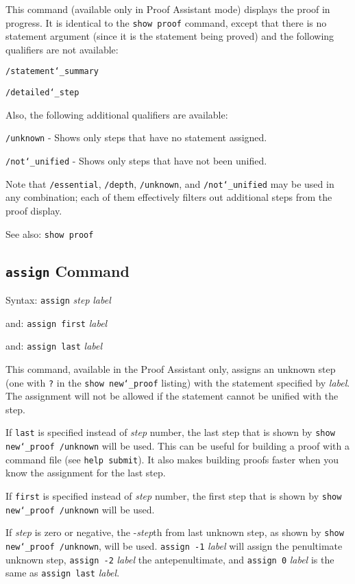 This command (available only in Proof Assistant mode) displays the proof
in progress.  It is identical to the \texttt{show proof} command, except that
there is no statement argument (since it is the statement being proved) and
the following qualifiers are not available:

    \texttt{/statement{\char`\_}summary}

    \texttt{/detailed{\char`\_}step}

Also, the following additional qualifiers are available:

    \texttt{/unknown} - Shows only steps that have no statement assigned.

    \texttt{/not{\char`\_}unified} - Shows only steps that have not been unified.

Note that \texttt{/essential}, \texttt{/depth}, \texttt{/unknown}, and
\texttt{/not{\char`\_}unified} may be
used in any combination; each of them effectively filters out additional
steps from the proof display.

See also:  \texttt{show proof}






\subsection{\texttt{assign} Command}
Syntax:   \texttt{assign} {\em step} {\em label}

   and:   \texttt{assign first} {\em label}

   and:   \texttt{assign last} {\em label}


This command, available in the Proof Assistant only, assigns an unknown
step (one with \texttt{?} in the \texttt{show new{\char`\_}proof}
listing) with the statement specified by {\em label}.  The assignment
will not be allowed if the statement cannot be unified with the step.

If \texttt{last} is specified instead of {\em step} number, the last
step that is shown by \texttt{show new{\char`\_}proof /unknown} will be
used.  This can be useful for building a proof with a command file (see
\texttt{help submit}).  It also makes building proofs faster when you know
the assignment for the last step.

If \texttt{first} is specified instead of {\em step} number, the first
step that is shown by \texttt{show new{\char`\_}proof /unknown} will be
used.

If {\em step} is zero or negative, the -{\em step}th from last unknown
step, as shown by \texttt{show new{\char`\_}proof /unknown}, will be
used.  \texttt{assign -1} {\em label} will assign the penultimate
unknown step, \texttt{assign -2} {\em label} the antepenultimate, and
\texttt{assign 0} {\em label} is the same as \texttt{assign last} {\em
label}.

